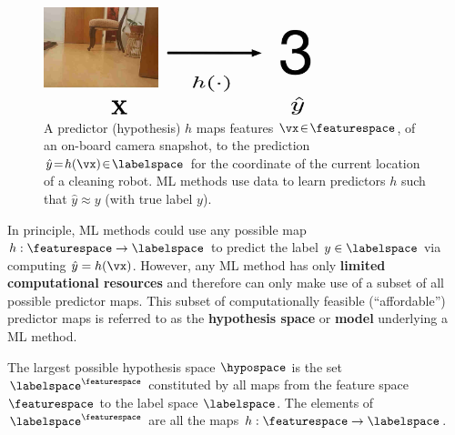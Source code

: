 \documentclass[12pt]{report}
\begin{document}
\begin{figure}[htbp]
%   
\begin{minipage}{\textwidth}
\begin{center}
   \includegraphics[width=0.7\textwidth]{HypoMap1.jpg}  
   \end{center}
\end{minipage}
\caption{A predictor (hypothesis) $h$ maps features $\vx\!\in\!\featurespace$, of 
	an on-board camera snapshot, to the prediction $\hat{y}\!=\!h(\vx)\!\in\!\labelspace$ 
	for the coordinate of the current location of a cleaning robot. ML methods use data 
	to learn predictors $h$ such that $\hat{y}\!\approx\!y$ (with true label $y$).}
\label{fig_feature_map_eval}
\end{figure}

In principle, ML methods could use any possible map $h: \featurespace \rightarrow \labelspace$ 
to predict the label $y \in \labelspace$ via computing $\hat{y} = h(\vx)$. 
However, any ML method has only {\bf limited computational resources} 
and therefore can only make use of a subset of all possible predictor maps. 
This subset of computationally feasible (``affordable'') predictor maps 
is referred to as the {\bf hypothesis space} or {\bf model} underlying 
a ML method. 

The largest possible hypothesis space $\hypospace$ is the set 
$\labelspace^{\featurespace}$ constituted by all maps from the 
feature space $\featurespace$ to the label space $\labelspace$.
The elements of $\labelspace^{\featurespace}$ are all the maps 
$h: \featurespace \rightarrow \labelspace$.  
\end{document}
